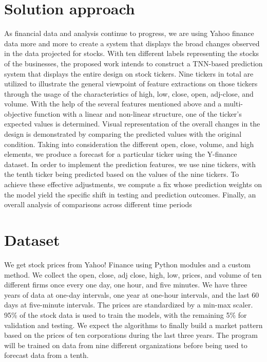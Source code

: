 \section{Solution approach}
\label{sec:intro_sol} %
As financial data and analysis continue to progress, we are using Yahoo finance data more and more to create a system that displays the broad changes observed in the data projected for stocks. With ten different labels representing the stocks of the businesses, the proposed work intends to construct a TNN-based prediction system that displays the entire design on stock tickers. Nine tickers in total are utilized to illustrate the general viewpoint of feature extractions on those tickers through the usage of the characteristics of high, low, close, open, adj-close, and volume. With the help of the several features mentioned above and a multi-objective function with a linear and non-linear structure, one of the ticker's expected values is determined. Visual representation of the overall changes in the design is demonstrated by comparing the predicted values with the original condition.
Taking into consideration the different open, close, volume, and high elements, we produce a forecast for a particular ticker using the Y-finance dataset. In order to implement the prediction features, we use nine tickers, with the tenth ticker being predicted based on the values of the nine tickers. To achieve these effective adjustments, we compute a fix whose prediction weights on the model yield the specific shift in testing and prediction outcomes. Finally, an overall analysis of comparisons across different time periods

\section{Dataset} %
\label{sec:intro_sum_results} %
We get stock prices from Yahoo! Finance using Python modules and a custom method. We collect the open, close, adj close, high, low, prices, and volume of ten different firms once every one day, one hour, and five minutes. We have three years of data at one-day intervals, one year at one-hour intervals, and the last 60 days at five-minute intervals. The prices are standardized by a min-max scaler. 95\% of the stock data is used to train the models, with the remaining 5\% for validation and testing. We expect the algorithms to finally build a market pattern based on the prices of ten corporations during the last three years. The program will be trained on data from nine different organizations before being used to forecast data from a tenth.

